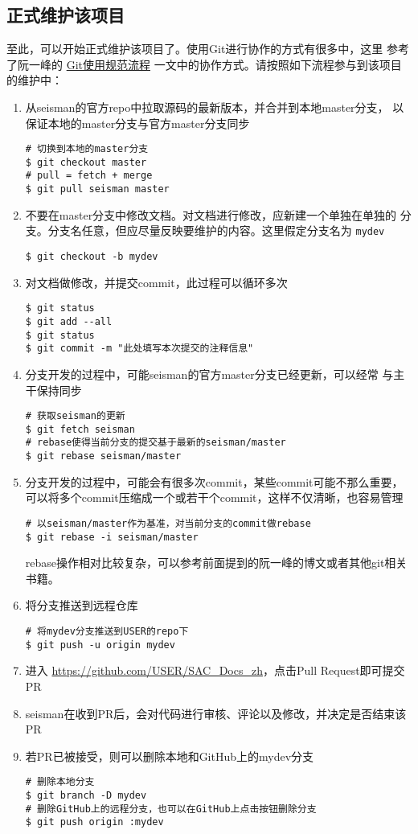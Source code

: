 \subsection{正式维护该项目}
至此，可以开始正式维护该项目了。使用Git进行协作的方式有很多中，这里
参考了阮一峰的 \href{http://www.ruanyifeng.com/blog/2015/08/git-use-process.html}{Git使用规范流程}
一文中的协作方式。请按照如下流程参与到该项目的维护中：
\begin{enumerate}
\item 从seisman的官方repo中拉取源码的最新版本，并合并到本地master分支，
    以保证本地的master分支与官方master分支同步
\begin{verbatim}
# 切换到本地的master分支
$ git checkout master
# pull = fetch + merge
$ git pull seisman master
\end{verbatim}
\item 不要在master分支中修改文档。对文档进行修改，应新建一个单独在单独的
    分支。分支名任意，但应尽量反映要维护的内容。这里假定分支名为 \texttt{mydev}
\begin{verbatim}
$ git checkout -b mydev
\end{verbatim}
\item 对文档做修改，并提交commit，此过程可以循环多次
\begin{verbatim}
$ git status
$ git add --all
$ git status
$ git commit -m "此处填写本次提交的注释信息"
\end{verbatim}
\item 分支开发的过程中，可能seisman的官方master分支已经更新，可以经常
    与主干保持同步
\begin{verbatim}
# 获取seisman的更新
$ git fetch seisman
# rebase使得当前分支的提交基于最新的seisman/master
$ git rebase seisman/master
\end{verbatim}
\item 分支开发的过程中，可能会有很多次commit，某些commit可能不那么重要，
    可以将多个commit压缩成一个或若干个commit，这样不仅清晰，也容易管理
\begin{verbatim}
# 以seisman/master作为基准，对当前分支的commit做rebase
$ git rebase -i seisman/master
\end{verbatim}
rebase操作相对比较复杂，可以参考前面提到的阮一峰的博文或者其他git相关书籍。
\item 将分支推送到远程仓库
\begin{verbatim}
# 将mydev分支推送到USER的repo下
$ git push -u origin mydev
\end{verbatim}
\item 进入 \url{https://github.com/USER/SAC_Docs_zh}，点击Pull Request即可提交PR
\item seisman在收到PR后，会对代码进行审核、评论以及修改，并决定是否结束该PR
\item 若PR已被接受，则可以删除本地和GitHub上的mydev分支
\begin{verbatim}
# 删除本地分支
$ git branch -D mydev
# 删除GitHub上的远程分支，也可以在GitHub上点击按钮删除分支
$ git push origin :mydev
\end{verbatim}
\end{enumerate}

